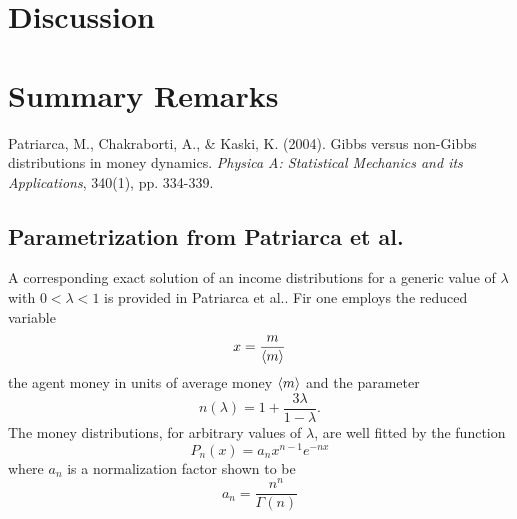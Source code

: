 \documentclass[10pt, a4paper]{amsart}
\begin{document}




\section{Discussion}
		
\section{Summary Remarks}


\begin{thebibliography}{10}

 Patriarca, M., Chakraborti, A., \& Kaski, K. (2004). 
	Gibbs versus non-Gibbs distributions in money dynamics. 
	\emph{Physica A: Statistical Mechanics and its Applications},
	340(1), pp. 334-339.
\end{thebibliography}

\vfill
\pagebreak

\begin{appendices}

\section{Parametrization from Patriarca et al.}
\label{app:partriarca}
A corresponding exact solution of an income distributions for a generic value of $\lambda$ with $0<\lambda<1$ is provided in Patriarca et al.\cite{Patriarca}. Fir one employs the reduced variable
\begin{equation}
x = \frac{m}{\ev{m}}
\end{equation}
the agent money in units of average money $\ev{m}$ and the parameter
\begin{equation}
n(\lambda) = 1 + \frac{3\lambda}{1-\lambda}.
\end{equation}
The money distributions, for arbitrary values of $\lambda$, are well fitted by the function
\begin{equation}
P_n(x) = a_nx^{n-1}e^{-nx}
\end{equation}
where $a_n$ is a normalization factor shown to be
\begin{equation}
a_n = \frac{n^n}{\Gamma(n)}
\end{equation}
\end{appendices}
\end{document}
